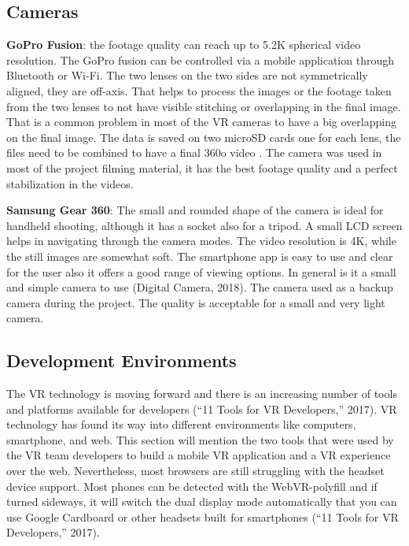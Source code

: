 \subsection{Cameras}
\textbf{GoPro Fusion}: the footage quality can reach up to 5.2K spherical video
resolution. The GoPro fusion can be controlled via a mobile
application through Bluetooth or Wi-Fi. The two lenses on the two
sides are not symmetrically aligned, they are off-axis. That helps to
process the images or the footage taken from the two lenses to not
have visible stitching or overlapping in the final image. That is a
common problem in most of the VR cameras to have a big overlapping on the final image. The
data is saved on two microSD cards one for each lens, the files need to be combined to have
a final 360o video \citep{Easton2018}. The camera was used in most of the project filming material,
it has the best footage quality and a perfect stabilization in the videos.


\textbf{Samsung Gear 360}: The small and rounded shape of the camera is ideal for
handheld shooting, although it has a socket also for a tripod. A small LCD
screen helps in navigating through the camera modes. The video resolution is
4K, while the still images are somewhat soft. The smartphone app is easy to
use and clear for the user also it offers a good range of viewing options. In
general is it a small and simple camera to use (Digital Camera, 2018). The
camera used as a backup camera during the project. The quality is acceptable
for a small and very light camera.

\subsection{Development Environments}

The VR technology is moving forward and there is an increasing number of tools and platforms
available for developers (“11 Tools for VR Developers,” 2017). VR technology has found its
way into different environments like computers, smartphone, and web. This section will
mention the two tools that were used by the VR team developers to build a mobile VR
application and a VR experience over the web. Nevertheless, most browsers are still struggling
with the headset device support. Most phones can be detected with the WebVR-polyfill and
if turned sideways, it will switch the dual display mode automatically that you can use Google
Cardboard or other headsets built for smartphones (“11 Tools for VR Developers,” 2017).


